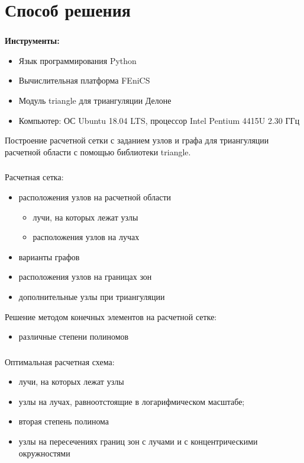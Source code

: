 \section{Способ решения}

\begin{frame}
\frametitle{\insertsection}

\textbf{Инструменты:}
\begin{itemize}
    \item Язык программирования Python
    \item Вычислительная платформа FEniCS
    \item Модуль triangle для триангуляции Делоне
    \item Компьютер: ОС Ubuntu 18.04 LTS, процессор Intel Pentium 4415U 2.30 ГГц
\end{itemize}
\end{frame}

Построение расчетной сетки с заданием узлов и графа для триангуляции расчетной области с помощью библиотеки triangle.

\begin{frame}
\frametitle{\insertsection}

Расчетная сетка:
\begin{itemize}
\item расположения узлов на расчетной области
\begin{itemize}
  \item лучи, на которых лежат узлы
  \item расположения узлов на лучах
\end{itemize}
\item варианты графов
\item расположения узлов на границах зон
\item дополнительные узлы при триангуляции
\end{itemize}

Решение методом конечных элементов на расчетной сетке:
\begin{itemize}
    \item различные степени полиномов
\end{itemize}
\end{frame}

\begin{frame}
\frametitle{\insertsection}

Оптимальная расчетная схема:
\begin{itemize}
    \item лучи, на которых лежат узлы
    \item узлы на лучах, равноотстоящие в логарифмическом масштабе;
    \item вторая степень полинома
    \item узлы на пересечениях границ зон с лучами и с концентрическими окружностями
\end{itemize}
\end{frame}

